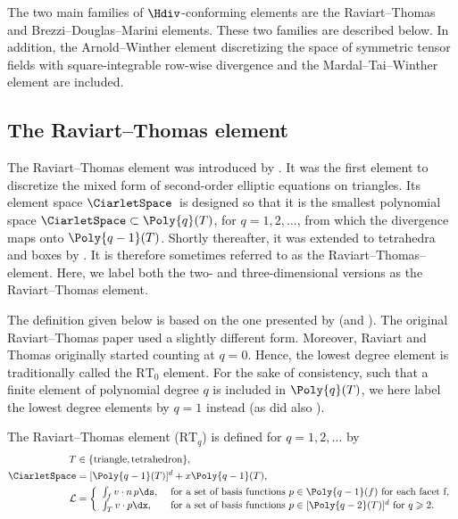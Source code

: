 The two main families of $\Hdiv$-conforming elements are the
Raviart--Thomas and Brezzi--Douglas--Marini elements. These two
families are described below. In addition, the Arnold--Winther element
discretizing the space of symmetric tensor fields with
square-integrable row-wise divergence and the Mardal--Tai--Winther
element are included.

\subsection{The Raviart--Thomas element}
\label{sec:raviartthomas}

The Raviart--Thomas element was introduced
by \citet{RaviartThomas1977}. It was the first element to discretize
the mixed form of second-order elliptic equations on triangles. Its
element space $\CiarletSpace$ is designed so that it is the smallest
polynomial space $\CiarletSpace \subset \Poly{q}(T)$, for $q = 1, 2,
\dots$, from which the divergence maps onto $\Poly{q-1}(T)$. Shortly
thereafter, it was extended to tetrahedra and boxes
by \citet{Nedelec1980}. It is therefore sometimes referred to as the
Raviart--Thomas--\nedelec{} element. Here, we label both the two- and
three-dimensional versions as the Raviart--Thomas element.

The definition given below is based on the one presented
by \citet{Nedelec1980} (and \citet{BrezziFortin1991}). The original
Raviart--Thomas paper used a slightly different form. Moreover,
Raviart and Thomas originally started counting at $q = 0$. Hence, the
lowest degree element is traditionally called the $\mathrm{RT}_0$
element.  For the sake of consistency, such that a finite element of
polynomial degree $q$ is included in $\Poly{q}(T)$, we here label the
lowest degree elements by $q = 1$ instead (as did also \nedelec{}).

\begin{definition}
  The Raviart--Thomas element ($\mathrm{RT}_q$) is
  defined for $q = 1, 2, \dots$ by
  \begin{align}
    T &\in \{ \mathrm{triangle}{}, \mathrm{tetrahedron}{}\}, \\
    \CiarletSpace &= [\Poly{q-1}(T)]^d  + x \Poly{q-1}(T), \\
    \mathcal{L} &=
    \left \{
    \begin{array}{ll}
      \int_{f} v \cdot n \, p \ds,
      & \text{ for a set of basis functions } p \in \Poly{q-1}(f)
      \text{ for each facet } $f$, \\
      \int_{T} v \cdot p \dx,
      & \text{ for a set of basis functions } p \in [\Poly{q-2}(T)]^d
      \text{ for } q \geqslant 2. \\
    \end{array}
    \right .
  \end{align}
\end{definition}

